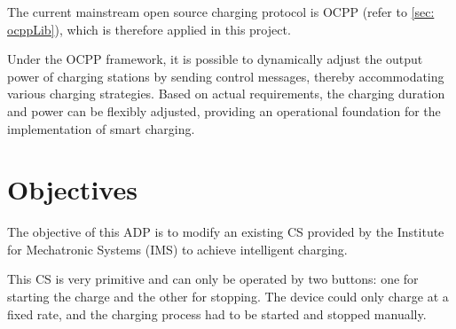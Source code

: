 \documentclass[
	english,
	ruledheaders=section,%
	class=report,%
	thesis={type=Report},%
	accentcolor=9c,%
	custommargins=true,%
	marginpar=false,%
	parskip=half-,%
	fontsize=11pt,%
	logofile={img/tuda_logo.pdf}, %
]{tudapub}
\begin{document}
The current mainstream open source charging protocol is \ac{OCPP} (refer to \autoref{sec: ocppLib}), which is therefore applied in this project.

Under the \ac{OCPP} framework, it is possible to dynamically adjust the output power of charging stations by sending control messages, thereby accommodating various charging strategies. Based on actual requirements, the charging duration and power can be flexibly adjusted, providing an operational foundation for the implementation of smart charging.



\section{Objectives}


The objective of this ADP is to modify an existing \ac{CS} provided by the Institute for Mechatronic Systems (IMS) to achieve intelligent charging.

This \ac{CS} is very primitive and can only be operated by two buttons: one for starting the charge and the other for stopping. The device could only charge at a fixed rate, and the charging process had to be started and stopped manually.
\end{document}
